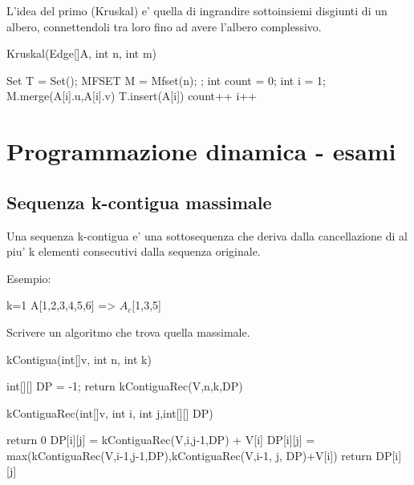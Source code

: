 \documentclass[oneside]{book}
\begin{document}
L'idea del primo (Kruskal) e' quella di ingrandire sottoinsiemi disgiunti di un albero, connettendoli tra loro fino ad avere l'albero complessivo.

\begin{algorithm}
\caption{Kruskal(Edge[]A, int n, int m)\label{alg:cap}}

\begin{algorithmic}
\State Set T = Set();
\State MFSET M = Mfset(n);
;
\State int count = 0;
\State int i = 1;
	\State M.merge(A[i].u,A[i].v)
	\State T.insert(A[i])
	\State count++
	\EndIf
	\State i++
\EndWhile

\end{algorithmic}
\end{algorithm}



\chapter{Programmazione dinamica - esami}
\section{Sequenza k-contigua massimale}
Una sequenza k-contigua e' una sottosequenza che deriva dalla cancellazione di al piu' k elementi consecutivi dalla sequenza originale.

Esempio: 

k=1
A[1,2,3,4,5,6] => $A_c$[1,3,5] 

Scrivere un algoritmo che trova quella massimale.

\begin{algorithm}
\caption{kContigua(int[]v, int n, int k)\label{cap:alg}}
\begin{algorithmic}
\State int[][] DP = -1;
\State return kContiguaRec(V,n,k,DP)
\end{algorithmic}
\end{algorithm}

\begin{algorithm}
\caption{kContiguaRec(int[]v, int i, int j,int[][] DP)\label{cap:alg}}
\begin{algorithmic}
	\State return 0
\EndIf
{}
		\State DP[i][j] = kContiguaRec(V,i,j-1,DP) + V[i]
	\Else
		\State DP[i][j] = max(kContiguaRec(V,i-1,j-1,DP),kContiguaRec(V,i-1, j, DP)+V[i])
	\EndIf
\EndIf		
return DP[i][j]
\end{algorithmic}
\end{algorithm}
\end{document}
